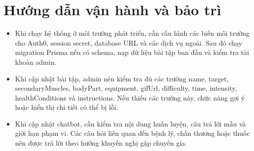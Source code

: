 \section{Hướng dẫn vận hành và bảo trì}

\begin{itemize}

    \item Khi chạy hệ thống ở môi trường phát triển, cần cấu hình các biến môi trường cho Auth0, session secret, database URL và các dịch vụ ngoài. Sau đó chạy migration Prisma nếu có schema, nạp dữ liệu bài tập ban đầu và kiểm tra tài khoản admin.

    \item Khi cập nhật bài tập, admin nên kiểm tra đủ các trường name, target, secondaryMuscles, bodyPart, equipment, gifUrl, difficulty, time, intensity, healthConditions và instructions. Nếu thiếu các trường này, chức năng gợi ý hoặc hiển thị chi tiết có thể bị lỗi.

    \item Khi cập nhật chatbot, cần kiểm tra nội dung huấn luyện, câu trả lời mẫu và giới hạn phạm vi. Các câu hỏi liên quan đến bệnh lý, chấn thương hoặc thuốc nên được trả lời theo hướng khuyến nghị gặp chuyên gia.

\end{itemize}
